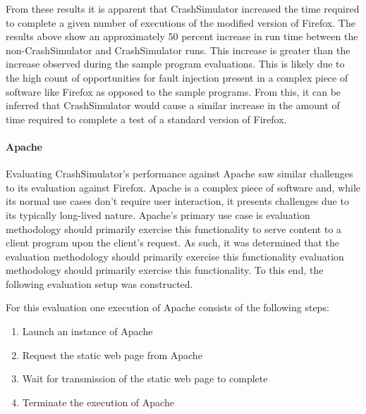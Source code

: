                 From these results it is apparent that CrashSimulator  increased the time required to complete a given
                number of executions of the modified version of Firefox. The results above show an approximately 50
                percent increase in run time between the non-CrashSimulator and CrashSimulator runs. This increase is
                greater than the increase observed during the sample program evaluations. This is likely due to the high
                count of opportunities for fault injection present in a complex piece of software like Firefox as
                opposed to the sample programs. From this, it can be inferred that CrashSimulator would cause a similar
                increase in the amount of time required to complete a test of a standard version of Firefox.

            \paragraph{Apache}

                Evaluating CrashSimulator's performance against Apache saw similar challenges to its evaluation against
                Firefox. Apache is a complex piece of software and, while its normal use cases don't require user
                interaction, it presents challenges due to its typically long-lived nature. Apache's primary use case is
                evaluation methodology should primarily exercise this functionality to serve content to a client program
                upon the client's request. As such, it was determined that the evaluation methodology should primarily
                exercise this functionality evaluation methodology should primarily exercise this functionality. To this
                end, the following evaluation setup was constructed.

                For this evaluation one execution of Apache consists of the following steps:

                \begin{enumerate}
                    \item{} Launch an instance of Apache
                    \item{} Request the static web page from Apache
                    \item{} Wait for transmission of the static web page to complete
                    \item{} Terminate the execution of Apache
                \end{enumerate}

